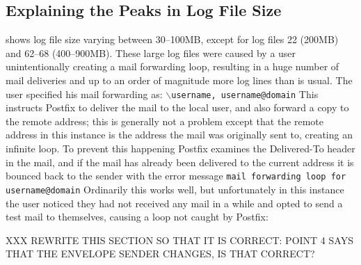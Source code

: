 

\subsection{Explaining the Peaks in Log File Size}

\label{Explaining the peaks in log file size}

 shows log
file size varying between 30--100MB, except for log files 22 (200MB) and
62--68 (400--900MB).  These large log files were caused by a user
unintentionally creating a mail forwarding loop, resulting in a huge number
of mail deliveries and up to an order of magnitude more log lines than is
usual.  The user specified his mail forwarding as: \newline{}
\tab{}\texttt{$\backslash$username, username@domain} \newline{} This
instructs Postfix to deliver the mail to the local user, and also forward a
copy to the remote address; this is generally not a problem except that the
remote address in this instance is the address the mail was originally sent
to, creating an infinite loop.  To prevent this happening Postfix examines
the Delivered-To header in the mail, and if the mail has already been
delivered to the current address it is bounced back to the sender with the
error message \newline{} \tab{} \texttt{mail forwarding loop for
username@domain}\newline{}  Ordinarily this works well, but unfortunately
in this instance the user noticed they had not received any mail in a while
and opted to send a test mail to themselves, causing a loop not caught by
Postfix:

XXX REWRITE THIS SECTION SO THAT IT IS CORRECT\@: POINT 4 SAYS THAT THE
ENVELOPE SENDER CHANGES, IS THAT CORRECT\@?

